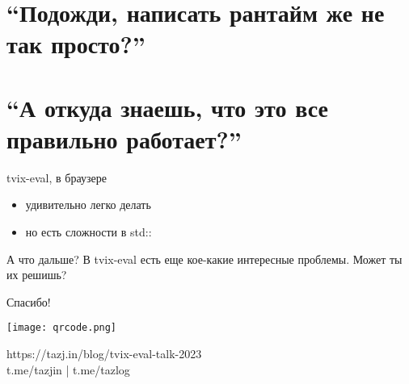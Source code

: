 \documentclass[12pt]{beamer}
\newenvironment{code}{\ttfamily}{\par}
\begin{document}

  \section{``Подожди, написать рантайм же не так просто?''}


  \section{``А откуда знаешь, что это все правильно работает?''}


  \begin{frame}{tvix-eval, в браузере}
    \begin{itemize}
    \item удивительно легко делать
    \item но есть сложности в \begin{code}std::\end{code}
    \end{itemize}
  \end{frame}

  \begin{frame}{А что дальше?}
    В tvix-eval есть еще кое-какие интересные проблемы. Может ты их
    решишь?
  \end{frame}

  \begin{frame}{Спасибо!}
    \begin{center}
      \texttt{[image: qrcode.png]}

      https://tazj.in/blog/tvix-eval-talk-2023 \\
      t.me/tazjin | t.me/tazlog
    \end{center}
  \end{frame}
\end{document}
